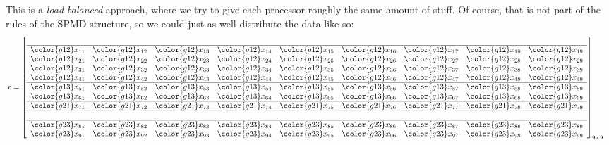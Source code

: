 This is a \emph{load balanced} approach, where we try to give each processor roughly the same amount of stuff.  Of course, that is not part of the rules of the SPMD structure, so we could just as well distribute the data like so:
\begin{align*}
x &= \left[
      \begin{array}{lllllllll}
      \\\hline
      \color{g12}x_{11} & \color{g12}x_{12} & \color{g12}x_{13} & \color{g12}x_{14} & \color{g12}x_{15} & \color{g12}x_{16} & \color{g12}x_{17} & \color{g12}x_{18} & \color{g12}x_{19}\\
      \color{g12}x_{21} & \color{g12}x_{22} & \color{g12}x_{23} & \color{g12}x_{24} & \color{g12}x_{25} & \color{g12}x_{26} & \color{g12}x_{27} & \color{g12}x_{28} & \color{g12}x_{29}\\
      \color{g12}x_{31} & \color{g12}x_{32} & \color{g12}x_{33} & \color{g12}x_{34} & \color{g12}x_{35} & \color{g12}x_{36} & \color{g12}x_{37} & \color{g12}x_{38} & \color{g12}x_{39}\\
      \color{g12}x_{41} & \color{g12}x_{42} & \color{g12}x_{43} & \color{g12}x_{44} & \color{g12}x_{45} & \color{g12}x_{46} & \color{g12}x_{47} & \color{g12}x_{48} & \color{g12}x_{49}\\\hline
      \color{g13}x_{51} & \color{g13}x_{52} & \color{g13}x_{53} & \color{g13}x_{54} & \color{g13}x_{55} & \color{g13}x_{56} & \color{g13}x_{57} & \color{g13}x_{58} & \color{g13}x_{59}\\
      \color{g13}x_{61} & \color{g13}x_{62} & \color{g13}x_{63} & \color{g13}x_{64} & \color{g13}x_{65} & \color{g13}x_{66} & \color{g13}x_{67} & \color{g13}x_{68} & \color{g13}x_{69}\\\hline
      \color{g21}x_{71} & \color{g21}x_{72} & \color{g21}x_{73} & \color{g21}x_{74} & \color{g21}x_{75} & \color{g21}x_{76} & \color{g21}x_{77} & \color{g21}x_{78} & \color{g21}x_{79}\\\hline\\\hline
      \color{g23}x_{81} & \color{g23}x_{82} & \color{g23}x_{83} & \color{g23}x_{84} & \color{g23}x_{85} & \color{g23}x_{86} & \color{g23}x_{87} & \color{g23}x_{88} & \color{g23}x_{89}\\
      \color{g23}x_{91} & \color{g23}x_{92} & \color{g23}x_{93} & \color{g23}x_{94} & \color{g23}x_{95} & \color{g23}x_{96} & \color{g23}x_{97} & \color{g23}x_{98} & \color{g23}x_{99}\\
      \end{array}
\right]_{9\times 9}
\end{align*}
